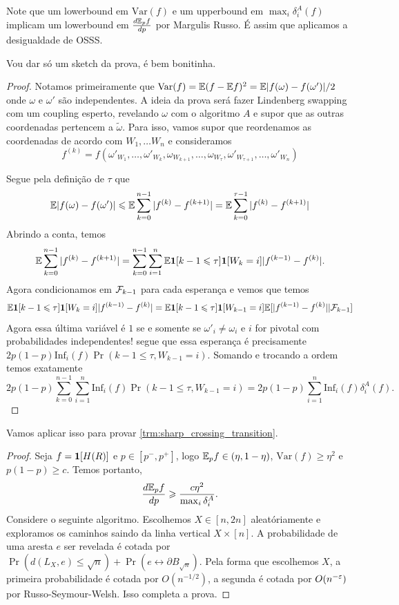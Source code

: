 \begin{remark}
	Note que um lowerbound em $\text{Var}(f)$ e um upperbound em $\max_i
	\delta_i^A(f)$
	implicam um lowerbound em $\frac{d\mathbb{E}_p f}{dp}$ por Margulis Russo. É assim
	que aplicamos a desigualdade de OSSS.
\end{remark}

Vou dar só um sketch da prova, é bem bonitinha.
\begin{proof}
	Notamos primeiramente que $\text{Var}(f) = \mathbb{E} (f - \mathbb{E} f)^2 = \mathbb{E}
	|f(\omega) - f(\omega')|/2$
	onde $\omega$ e $\omega'$ são independentes. A ideia da prova será
	fazer Lindenberg swapping
	com um  coupling esperto, revelando $\omega$ com o algoritmo $A$ e supor que
	as outras coordenadas pertencem a $\tilde{\omega}$. Para isso,
	vamos supor que reordenamos as coordenadas de acordo com $W_1, \dots W_n$ e
	consideramos
	\[f^{(k)} =  f(\omega'_{W_1}, \dots, \omega'_{W_k}, \omega_{W_{k+1}}, \dots,
	\omega_{W_{\tau}}, \omega'_{W_{\tau + 1}}, \dots, \omega'_{W_n})\]

	Segue pela definição de $\tau$ que
	\[
		\mathbb{E}|f(\omega) - f(\omega')| \leqslant \mathbb{E} \sum_{k = 0}^{n-1} |f^{(k)} -
		f^{(k+1)}|  = \mathbb{E} \sum_{k = 0}^{\tau - 1} |f^{(k)} - f^{(k+1)}|
	\]
	Abrindo a conta, temos
	\[
		\mathbb{E} \sum_{k = 0}^{n-1} |f^{(k)} - f^{(k+1)}| = \sum_{k = 0}^{n-1}
		\sum_{i = 1}^n \mathbb{E} \bm{1}[k - 1 \leqslant \tau]\bm{1}[W_k = i] |f^{(k-1)} - f^{(k)}|.
	\]
	Agora condicionamos em $\mathcal{F}_{k-1}$ para cada esperança e vemos que temos
	\[
		\mathbb{E} \bm{1}[k - 1 \leqslant \tau]\bm{1}[W_k = i] |f^{(k-1)} - f^{(k)}| = \mathbb{E}
		\bm{1}[k-1 \leqslant \tau] \bm{1}[W_{k-1} = i] \mathbb{E}[ |f^{(k-1)} - f^{(k)}| | \mathcal{F}_{k-1}]
	\]
	Agora essa última variável é $1$ se e somente se $\omega'_i \neq
	\omega_i$ e $i$ for pivotal com probabilidades independentes!
	segue que essa esperança é precisamente $2p(1-p)\text{Inf}_i(f)
	\Pr(k - 1 \leq \tau , W_{k-1} = i)$. Somando
	e trocando a ordem temos exatamente
	\[
		2p(1-p)\sum_{k = 0}^{n-1} \sum_{i = 1}^n \text{Inf}_i(f) \Pr(k-1
		\leq \tau, W_{k-1} = i) =
		2p(1-p) \sum_{i = 1}^n \text{Inf}_i(f) \delta_i^A(f).
	\]
\end{proof}

Vamos aplicar isso para provar \ref{trm:sharp_crossing_transition}.
\begin{proof}
	Seja $f = \bm{1}[H(R)]$ e $p \in [p^-, p^+]$, logo $\mathbb{E}_p f \in (\eta, 1-\eta)$,
	$\text{Var}(f) \geq \eta^2$ e $p(1-p) \geq c$. Temos portanto,
	\[
		\frac{d\mathbb{E}_p f}{dp} \geqslant \frac{c\eta^2}{\max_i \delta_i^A}.
	\]
	Considere o seguinte algoritmo. Escolhemos $X \in [n,2n]$ aleatóriamente
	e exploramos os caminhos saindo da linha vertical ${X} \times [n]$.
	A probabilidade
	de uma aresta $e$ ser revelada é cotada por $\Pr(d(L_X, e) \leq
	\sqrt{n}) + \Pr(e \leftrightarrow \partial B_{\sqrt{n}})$.
	Pela forma que escolhemos $X$, a primeira probabilidade é cotada por
	$O(n^{-1/2})$,
	a segunda é cotada por $O(n^{-\varepsilon})$ por Russo-Seymour-Welsh.
	Isso completa a prova.
\end{proof}
